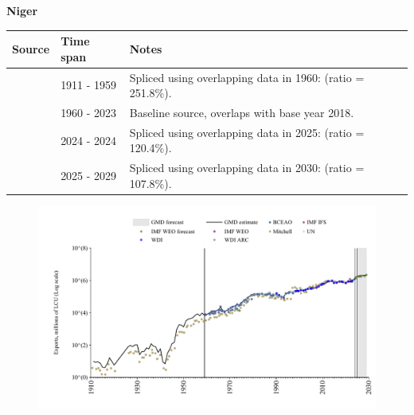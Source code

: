 \documentclass[12pt,a4paper,landscape]{article}
\begin{document}
\begin{adjustbox}{max totalsize={\paperwidth}{\paperheight},center}
\begin{minipage}[t][\textheight][t]{\textwidth}
\vspace*{0.5cm}
{}
\begin{center}
{\Large\bfseries Niger}
\end{center}
\vspace{0.5cm}
\begin{table}[H]
\centering
\small
\begin{tabular}{|l|l|l|}
\hline
\textbf{Source} & \textbf{Time span} & \textbf{Notes} \\
\hline
\rowcolor{white}\cite{Mitchell}& 1911 - 1959 &Spliced using overlapping data in 1960: (ratio = 251.8\%).\\
\rowcolor{lightgray}\cite{WDI}& 1960 - 2023 &Baseline source, overlaps with base year 2018.\\
\rowcolor{white}\cite{BCEAO}& 2024 - 2024 &Spliced using overlapping data in 2025: (ratio = 120.4\%).\\
\rowcolor{lightgray}\cite{IMF_WEO_forecast}& 2025 - 2029 &Spliced using overlapping data in 2030: (ratio = 107.8\%).\\
\hline
\end{tabular}
\end{table}
\begin{figure}[H]
\centering
\includegraphics[width=\textwidth,height=0.6\textheight,keepaspectratio]{graphs/NER_exports.pdf}
\end{figure}
\end{minipage}
\end{adjustbox}
\end{document}
